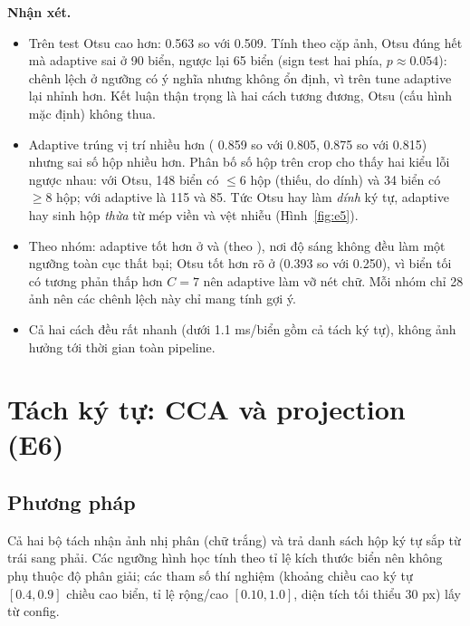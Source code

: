 \textbf{Nhận xét.}
\begin{itemize}
  \item Trên test Otsu cao hơn:  0.563 so với 0.509. Tính theo cặp ảnh, Otsu đúng hết mà adaptive sai ở 90 biển, ngược lại 65 biển (sign test hai phía, $p\approx 0.054$): chênh lệch ở ngưỡng có ý nghĩa nhưng không ổn định, vì trên tune adaptive lại nhỉnh hơn. Kết luận thận trọng là hai cách tương đương, Otsu (cấu hình mặc định) không thua.
  \item Adaptive trúng vị trí nhiều hơn ( 0.859 so với 0.805,  0.875 so với 0.815) nhưng sai số hộp nhiều hơn. Phân bố số hộp trên crop  cho thấy hai kiểu lỗi ngược nhau: với Otsu, 148 biển có $\le 6$ hộp (thiếu, do dính) và 34 biển có $\ge 8$ hộp; với adaptive là 115 và 85. Tức Otsu hay làm \emph{dính} ký tự, adaptive hay sinh hộp \emph{thừa} từ mép viền và vệt nhiễu (Hình~\ref{fig:e5}).
  \item Theo nhóm: adaptive tốt hơn ở  và  (theo ), nơi độ sáng không đều làm một ngưỡng toàn cục thất bại; Otsu tốt hơn rõ ở  (0.393 so với 0.250), vì biển tối có tương phản thấp hơn $C=7$ nên adaptive làm vỡ nét chữ. Mỗi nhóm chỉ 28 ảnh nên các chênh lệch này chỉ mang tính gợi ý.
  \item Cả hai cách đều rất nhanh (dưới 1.1 ms/biển gồm cả tách ký tự), không ảnh hưởng tới thời gian toàn pipeline.
\end{itemize}

\section{Tách ký tự: CCA và projection (E6)}
\label{sec:b-segment}

\subsection{Phương pháp}

Cả hai bộ tách nhận ảnh nhị phân (chữ trắng) và trả danh sách hộp ký tự sắp từ trái sang phải. Các ngưỡng hình học tính theo tỉ lệ kích thước biển nên không phụ thuộc độ phân giải; các tham số thí nghiệm (khoảng chiều cao ký tự $[0.4,0.9]$ chiều cao biển, tỉ lệ rộng/cao $[0.10,1.0]$, diện tích tối thiểu 30 px) lấy từ config.

